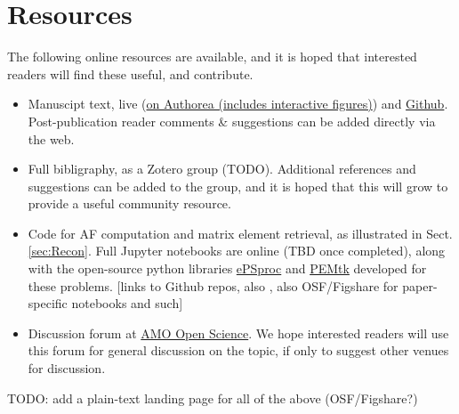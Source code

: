 \section{Resources\label{sec:resources}}

The following online resources are available, and it is hoped that interested readers will find these useful, and contribute.

\begin{itemize}
\item Manuscipt text, live (\href{https://www.authorea.com/users/71114/articles/447808-extracting-molecular-frame-photoionization-dynamics-from-experimental-data}{on Authorea (includes interactive figures)}) and \href{https://github.com/phockett/Extracting-Molecular-Frame-Photoionization-Dynamics-from-Experimental-Data}{Github}. Post-publication reader comments \& suggestions can be added directly via the web.
\item Full bibligraphy, as a Zotero group (TODO). Additional references and suggestions can be added to the group, and it is hoped that this will grow to provide a useful community resource.
\item Code for AF computation and matrix element retrieval, as illustrated in Sect. \ref{sec:Recon}. Full Jupyter notebooks are online (TBD once completed), along with the open-source python libraries \href{https://epsproc.readthedocs.io}{ePSproc} and \href{https://pemtk.readthedocs.io}{PEMtk} developed for these problems. [links to Github repos, also \cite{ePSprocAuthorea,ePSprocFigshare,ePSprocGithub}, also OSF/Figshare for paper-specific notebooks and such]
\item Discussion forum at \href{https://amoopenscience.femtolab.ca/}{AMO Open Science}. We hope interested readers will use this forum for general discussion on the topic, if only to suggest other venues for discussion.
\end{itemize}

TODO: add a plain-text landing page for all of the above (OSF/Figshare?)